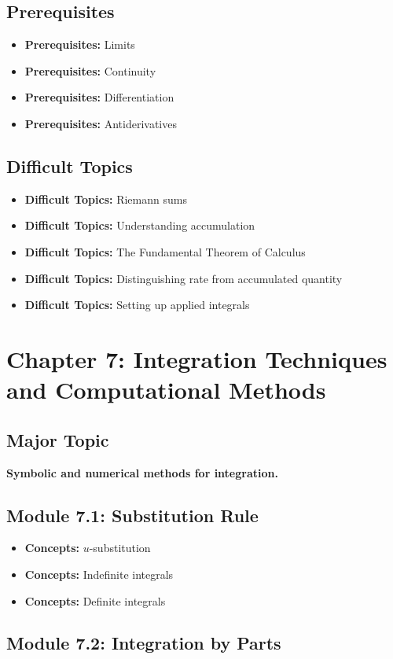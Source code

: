 \documentclass[11pt]{article}
\newcommand{\concept}[1]{\item \textbf{Concepts:} #1}
\newcommand{\difficult}[1]{\item \textbf{Difficult Topics:} #1}
\newcommand{\prereq}[1]{\item \textbf{Prerequisites:} #1}
\begin{document}
\subsection{Prerequisites}

\begin{itemize}
    \prereq{Limits}
    \prereq{Continuity}
    \prereq{Differentiation}
    \prereq{Antiderivatives}
\end{itemize}

\subsection{Difficult Topics}

\begin{itemize}
    \difficult{Riemann sums}
    \difficult{Understanding accumulation}
    \difficult{The Fundamental Theorem of Calculus}
    \difficult{Distinguishing rate from accumulated quantity}
    \difficult{Setting up applied integrals}
\end{itemize}


\section{Chapter 7: Integration Techniques and Computational Methods}

\subsection{Major Topic}

\textbf{Symbolic and numerical methods for integration.}

\subsection{Module 7.1: Substitution Rule}

\begin{itemize}
    \concept{$u$-substitution}
    \concept{Indefinite integrals}
    \concept{Definite integrals}
\end{itemize}

\subsection{Module 7.2: Integration by Parts}
\end{document}
